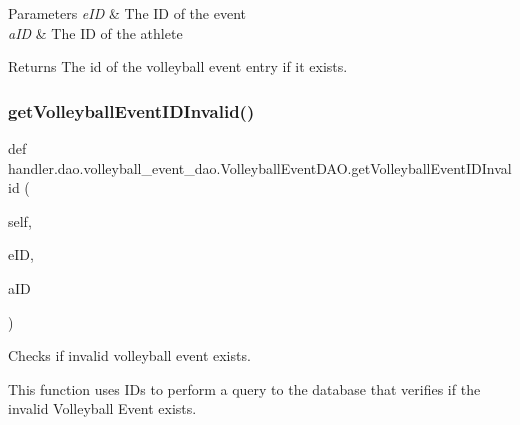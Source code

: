 \begin{DoxyParams}{Parameters}
{\em e\+ID} & The ID of the event \\
\hline
{\em a\+ID} & The ID of the athlete\\
\hline
\end{DoxyParams}
\begin{DoxyReturn}{Returns}
The id of the volleyball event entry if it exists. 
\end{DoxyReturn}
\mbox{\label{classhandler_1_1dao_1_1volleyball__event__dao_1_1_volleyball_event_d_a_o_ac857bf28aa93ba2eddd0d8f1e4403464}} 
\subsubsection{\texorpdfstring{get\+Volleyball\+Event\+I\+D\+Invalid()}{getVolleyballEventIDInvalid()}}
{\footnotesize\ttfamily def handler.\+dao.\+volleyball\+\_\+event\+\_\+dao.\+Volleyball\+Event\+D\+A\+O.\+get\+Volleyball\+Event\+I\+D\+Invalid (\begin{DoxyParamCaption}\item[{}]{self,  }\item[{}]{e\+ID,  }\item[{}]{a\+ID }\end{DoxyParamCaption})}



Checks if invalid volleyball event exists. 

This function uses I\+Ds to perform a query to the database that verifies if the invalid Volleyball Event exists.


